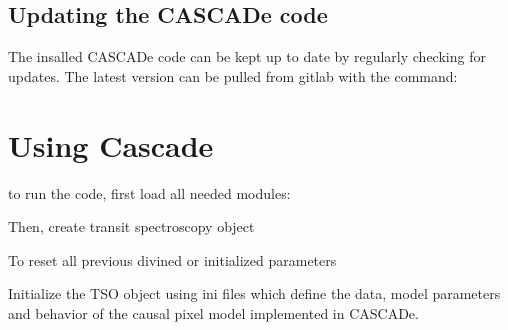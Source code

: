 \documentclass[a4paper,10pt,english]{sphinxmanual}
\begin{document}
\subsection{Updating the CASCADe code}
\label{\detokenize{install:updating-the-cascade-code}}
The insalled CASCADe code can be kept up to date by regularly checking for updates. The latest version can be
pulled from gitlab with the command:



\section{Using Cascade}
\label{\detokenize{howto:using-cascade}}\label{\detokenize{howto::doc}}
to run the code, first load all needed modules:

%
\begin{sphinxVerbatim}[commandchars=\\\{\}]
 
\end{sphinxVerbatim}

Then, create transit spectroscopy object

%
\begin{sphinxVerbatim}[commandchars=\\\{\}]
  
\end{sphinxVerbatim}

To reset all previous divined or initialized parameters

%
\begin{sphinxVerbatim}[commandchars=\\\{\}]
\end{sphinxVerbatim}

Initialize the TSO object using ini files which define the data, model parameters and behavior of the causal pixel model implemented in CASCADe.

%
\begin{sphinxVerbatim}[commandchars=\\\{\}]
  
   
                            
\end{sphinxVerbatim}
\end{document}

